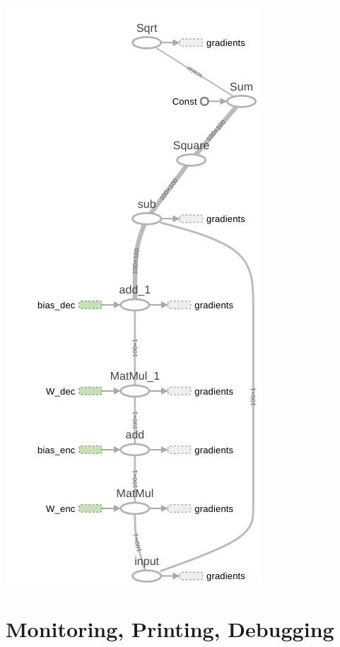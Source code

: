 \documentclass[mathserif]{beamer}
\begin{document}
\begin{frame}[plain]
	\includegraphics[scale=0.32]{tensorboard-ae-graph.png}
\end{frame}
\section{Monitoring, Printing, Debugging}
\end{document}
